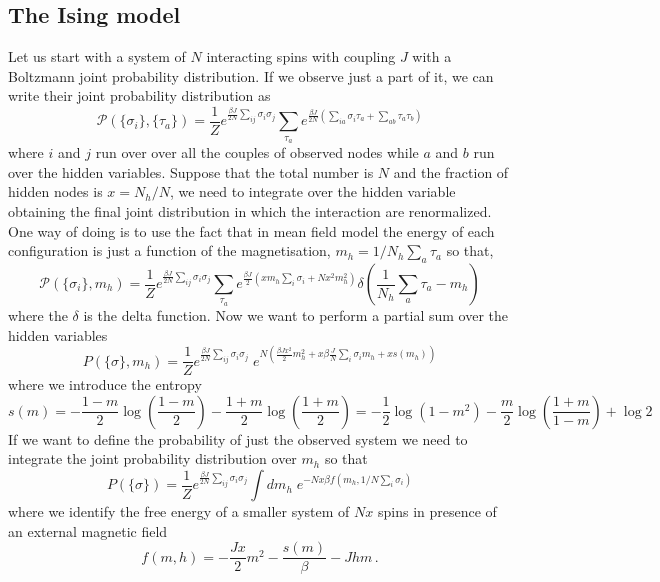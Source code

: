\documentclass[aps,pre,noshowpacs]{revtex4}
\begin{document}
\subsection{The Ising model}
Let us start with a system of $N$ interacting spins with coupling $J$ with a Boltzmann joint probability distribution. 
If we observe just a part of it, we can write their joint probability distribution as
\begin{equation}\label{fullprob}
\mathcal{P}(\{\sigma_i\},\{\tau_a\}) = \frac{1}{Z} e^{ \frac{\beta J}{2 N } \sum_{i j}  \sigma_i \sigma_j}  \sum_{\tau_a} e^{ \frac{\beta J}{2 N }\left( \sum_{ia} \sigma_i \tau_a + \sum_{ab} \tau_a \tau_b\right) }
\end{equation}
where $i$ and $j$ run over over all the couples of observed nodes while $a$ and $b$ run over the hidden variables. 
Suppose that the total number is $N$ and the fraction of hidden nodes is $x=N_h/N$, we need to
integrate over the hidden variable obtaining the final joint distribution in which the interaction
are renormalized.
One way of doing is to use the fact that in mean field model  the energy of each configuration is just a function of the
magnetisation, $m_h=1/N_h \sum_a \tau_a $ so that, 
\begin{equation}\label{fullprob}
\mathcal{P}(\{\sigma_i\}, m_h) =  \frac{1}{Z} e^{ \frac{\beta J}{2 N} \sum_{i j}  \sigma_i \sigma_j} \sum_{\tau_a} e^{ \frac{\beta J}{2}\left( x m_h \sum_{i} \sigma_i  + N x^2 m_h^2\right)} \delta\left( \frac{1}{N_h}\sum_a\tau_a-m_h \right)
\end{equation}
where the $\delta$ is the delta function. Now we want to perform a partial sum
over the hidden variables  
\begin{equation}\label{probmarg}
P(\{\sigma\},m_h) = \frac{1}{Z}e^{\frac{\beta J}{2 N} \sum_{i j}  \sigma_i \sigma_j}  \; e^{N \left( \frac{\beta J x^2}{2} m_h^2 +  x \beta \frac{J}{N} \sum_i\sigma_i m_h  + x s(m_h)\right)}
\end{equation}
where we introduce the entropy
\begin{equation}\label{entropy}
s(m)=-\frac{1-m}{2}\log\left(\frac{1-m}{2}\right)-\frac{1+m}{2}\log\left(\frac{1+m}{2}\right)=-\frac{1}{2}\log\left(1-m^2\right) - \frac{m}{2} \log\left(\frac{1+m}{1-m} \right)+ \log2
\end{equation}
If we want to define the probability of just the observed system we need to integrate the joint probability distribution
over $m_h$ so that
\begin{equation}\label{probmarg2}
P(\{\sigma\}) =\frac{1}{Z}e^{ \frac{\beta J}{2 N} \sum_{i j}  \sigma_i \sigma_j} \int dm_h  \;e^{-N x \beta f(m_h,1/N\sum_i \sigma_i)}
\end{equation}
where we identify the free energy of a  smaller system of $Nx$ spins in presence of an external magnetic field
\begin{equation}\label{freeenergy}
f(m,h)=-\frac{J x}{2} m^2 -  \frac{s(m) }{\beta} - J h m\,.
\end{equation}
\end{document}
